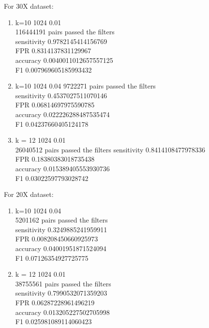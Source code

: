 \documentclass[11pt]{article}
\begin{document}
For 30X dataset:
\begin{enumerate}
\item
k=10 1024 0.01\\
116444191 pairs passed the filters\\
sensitivity 0.9782145414156769\\
FPR 0.8314137831129967\\
accuracy 0.0040011012657557125\\
F1 0.007969605185993432\\

\item
k=10 1024 0.04
9722271 pairs passed the filters\\
sensitivity 0.4537027511070146\\
FPR 0.06814697975590785\\
accuracy 0.022226288487535474\\
F1 0.04237660405124178\\

\item
k = 12 1024 0.01\\
26040512 pairs passed the filters
sensitivity 0.8414108477978336\\
FPR 0.18380383018735438\\
accuracy 0.015389405553930736\\
F1 0.03022597793028742\\
\end{enumerate}

For 20X dataset:
\begin{enumerate}
	\item
	k=10 1024 0.04\\
	5201162 pairs passed the filters\\
	sensitivity 0.3249885241959911\\
	FPR 0.008208450660925973\\
	accuracy 0.04001951871524094\\
	F1 0.07126354927725775\\
	
	\item
	k = 12 1024 0.01\\
	38755561 pairs passed the filters\\
	sensitivity 0.7990532071359203\\
	FPR 0.06287228961496219\\
	accuracy 0.013205227502705998\\
	F1 0.025981089114060423\\
\end{enumerate}
\end{document}
